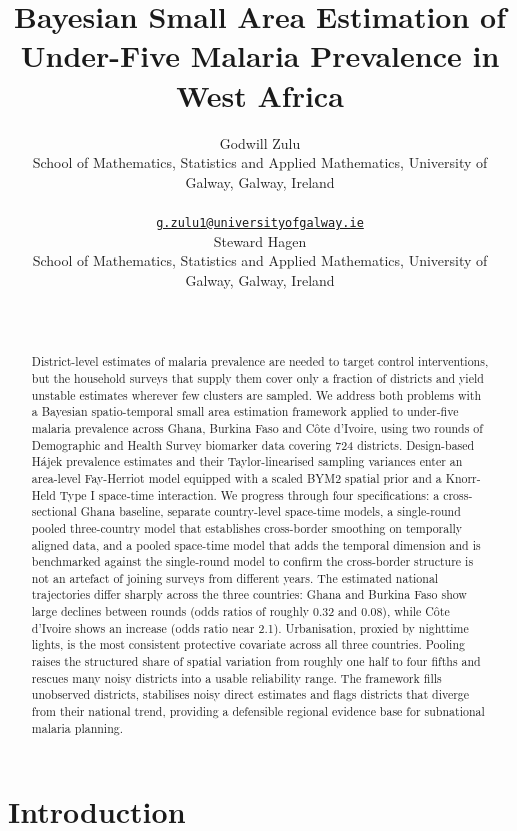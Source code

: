 \documentclass{article}
\title{Bayesian Small Area Estimation of Under-Five Malaria Prevalence
in West Africa}
\author{
    Godwill Zulu
   \\
    School of Mathematics, Statistics and Applied Mathematics,
University of Galway, Galway, Ireland \\
   \\
  \texttt{\href{mailto:g.zulu1@universityofgalway.ie}{\nolinkurl{g.zulu1@universityofgalway.ie}}} \\
   \And
    Steward Hagen
   \\
    School of Mathematics, Statistics and Applied Mathematics,
University of Galway, Galway, Ireland \\
   \\
  \texttt{} \\
  }
\begin{document}
\maketitle


\begin{abstract}
District-level estimates of malaria prevalence are needed to target
control interventions, but the household surveys that supply them cover
only a fraction of districts and yield unstable estimates wherever few
clusters are sampled. We address both problems with a Bayesian
spatio-temporal small area estimation framework applied to under-five
malaria prevalence across Ghana, Burkina Faso and Côte d'Ivoire, using
two rounds of Demographic and Health Survey biomarker data covering 724
districts. Design-based Hájek prevalence estimates and their
Taylor-linearised sampling variances enter an area-level Fay-Herriot
model equipped with a scaled BYM2 spatial prior and a Knorr-Held Type I
space-time interaction. We progress through four specifications: a
cross-sectional Ghana baseline, separate country-level space-time
models, a single-round pooled three-country model that establishes
cross-border smoothing on temporally aligned data, and a pooled
space-time model that adds the temporal dimension and is benchmarked
against the single-round model to confirm the cross-border structure is
not an artefact of joining surveys from different years. The estimated
national trajectories differ sharply across the three countries: Ghana
and Burkina Faso show large declines between rounds (odds ratios of
roughly 0.32 and 0.08), while Côte d'Ivoire shows an increase (odds
ratio near 2.1). Urbanisation, proxied by nighttime lights, is the most
consistent protective covariate across all three countries. Pooling
raises the structured share of spatial variation from roughly one half
to four fifths and rescues many noisy districts into a usable
reliability range. The framework fills unobserved districts, stabilises
noisy direct estimates and flags districts that diverge from their
national trend, providing a defensible regional evidence base for
subnational malaria planning.
\end{abstract}


\section{Introduction}\label{introduction}
\end{document}
